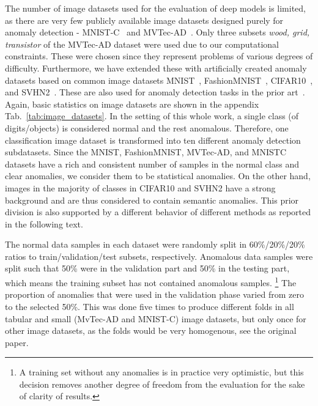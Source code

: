 The number of image datasets used for the evaluation of deep models is limited, as there are very few publicly available image datasets designed purely for anomaly detection - MNIST-C~\cite{muMNISTCRobustnessBenchmark2019} and MVTec-AD~\cite{bergmann2019mvtec}. Only three subsets \textit{wood, grid, transistor} of the MVTec-AD dataset were used due to our computational constraints. These were chosen since they represent problems of various degrees of difficulty. Furthermore, we have extended these with artificially created anomaly datasets based on common image datasets MNIST~\cite{lecun2010mnist}, FashionMNIST~\cite{xiao2017fashion}, CIFAR10~\cite{krizhevsky2009learning}, and SVHN2~\cite{netzer2011reading}. These are also used for anomaly detection tasks in the prior art~\cite{perera2019ocgan, pidhorskyi2018generative, ruff2018deep}. Again, basic statistics on image datasets are shown in the appendix Tab.~\ref{tab:image_datasets}. In the setting of this whole work, a single class (of digits/objects) is considered normal and the rest anomalous. Therefore, one classification image dataset is transformed into ten different anomaly detection subdatasets. Since the MNIST, FashionMNIST, MVTec-AD, and MNISTC datasets have a rich and consistent number of samples in the normal class and clear anomalies, we consider them to be statistical anomalies. On the other hand, images in the majority of classes in CIFAR10 and SVHN2 have a strong background and are thus considered to contain semantic anomalies. This prior division is also supported by a different behavior of different methods as reported in the following text.

The normal data samples in each dataset were randomly split in 60\%/20\%/20\% ratios to train/validation/test subsets, respectively. Anomalous data samples were split such that 50\% were in the validation part and 50\% in the testing part, which means the training subset has not contained anomalous samples. \footnote{A training set without any anomalies is in practice very optimistic, but this decision removes another degree of freedom from the evaluation for the sake of clarity of results.} The proportion of anomalies that were used in the validation phase varied from zero to the selected 50\%. This was done five times to produce different folds in all tabular and small (MvTec-AD and MNIST-C) image datasets, but only once for other image datasets, as the folds would be very homogenous, see the original paper.

